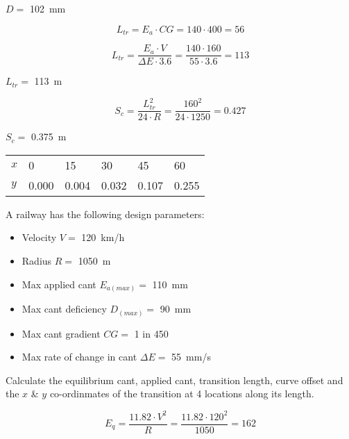 \documentclass{bcrre_exam}
\begin{document}
\begin{questions}
\begin{solution}
$D=$ \qty{102}{mm}

\begin{equation}
    L_{tr}=E_a \cdot CG = 140 \cdot 400 = 56
\end{equation}

\begin{equation}
    L_{tr} = \frac{E_a \cdot V}{\Delta E \cdot 3.6} = \frac{140 \cdot 160}{55 \cdot 3.6} = 113
\end{equation}

$L_{tr}=$ \qty{113}{m}

\begin{equation}
    S_c=\frac{L_{tr}^2}{24 \cdot R} = \frac{160^2}{24 \cdot 1250} = 0.427
\end{equation}

$S_c=$ \qty{0.375}{m}

\vspace{1cm}

\begin{tabular}{@{}llllll@{}}
\toprule
$x$ & \num{0}     & \num{15}    & \num{30}    & \num{45}    & \num{60}    \\ 
$y$ & \num{0.000} & \num{0.004} & \num{0.032} & \num{0.107} & \num{0.255} \\ \bottomrule
\end{tabular}

\end{solution}

\question 
A railway has the following design parameters:

\begin{itemize}
    \item Velocity $V=$ \qty{120}{km/h}
    \item Radius $R=$ \qty{1050}{m}
    \item Max applied cant $E_{a(max)}=$ \qty{110}{mm}
    \item Max cant deficiency $D_{(max)}=$ \qty{90}{mm}
    \item Max cant gradient $CG=$ \num{1} in \num{450}
    \item Max rate of change in cant $\Delta E=$ \qty{55}{mm/s}
\end{itemize}

Calculate the equilibrium cant, applied cant, transition length, curve offset and the $x$ \& $y$ co-ordinmates of the transition at 4 locations along its length.

\begin{solution}
\begin{equation}
    E_q=\frac{11.82 \cdot V^2}{R}=\frac{11.82 \cdot 120^2}{1050} = 162
\end{equation}


\end{solution}
\end{questions}
\end{document}

